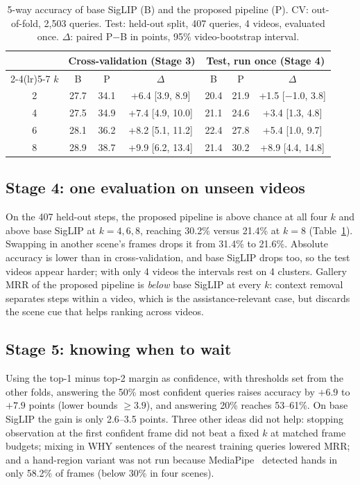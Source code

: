 \documentclass[conference,a4paper]{IEEEtran}
\begin{document}
\begin{table}[t]
\caption{5-way accuracy of base SigLIP (B) and the proposed pipeline (P). CV: out-of-fold, 2,503 queries. Test: held-out split, 407 queries, 4 videos, evaluated once. $\Delta$: paired P$-$B in points, 95\% video-bootstrap interval.}
\label{tab:ladder}
\centering
\setlength{\tabcolsep}{2.6pt}
\footnotesize
\begin{tabular}{ccccccc}
\toprule
& \multicolumn{3}{c}{Cross-validation (Stage 3)} & \multicolumn{3}{c}{Test, run once (Stage 4)} \\
\cmidrule(lr){2-4}\cmidrule(lr){5-7}
$k$ & B & P & $\Delta$ & B & P & $\Delta$ \\
\midrule
2 & 27.7 & 34.1 & +6.4 [3.9, 8.9] & 20.4 & 21.9 & +1.5 [$-$1.0, 3.8] \\
4 & 27.5 & 34.9 & +7.4 [4.9, 10.0] & 21.1 & 24.6 & +3.4 [1.3, 4.8] \\
6 & 28.1 & 36.2 & +8.2 [5.1, 11.2] & 22.4 & 27.8 & +5.4 [1.0, 9.7] \\
8 & 28.9 & 38.7 & +9.9 [6.2, 13.4] & 21.4 & 30.2 & +8.9 [4.4, 14.8] \\
\bottomrule
\end{tabular}
\end{table}

\subsection{Stage 4: one evaluation on unseen videos}
On the 407 held-out steps, the proposed pipeline is above chance at all four $k$ and above base SigLIP at $k=4,6,8$, reaching 30.2\% versus 21.4\% at $k=8$ (Table~\ref{tab:ladder}). Swapping in another scene's frames drops it from 31.4\% to 21.6\%. Absolute accuracy is lower than in cross-validation, and base SigLIP drops too, so the test videos appear harder; with only 4 videos the intervals rest on 4 clusters. Gallery MRR of the proposed pipeline is \emph{below} base SigLIP at every $k$: context removal separates steps within a video, which is the assistance-relevant case, but discards the scene cue that helps ranking across videos.

\subsection{Stage 5: knowing when to wait}
Using the top-1 minus top-2 margin as confidence, with thresholds set from the other folds, answering the 50\% most confident queries raises accuracy by $+6.9$ to $+7.9$ points (lower bounds $\geq 3.9$), and answering 20\% reaches 53--61\%. On base SigLIP the gain is only 2.6--3.5 points. Three other ideas did not help: stopping observation at the first confident frame did not beat a fixed $k$ at matched frame budgets; mixing in WHY sentences of the nearest training queries lowered MRR; and a hand-region variant was not run because MediaPipe~\cite{zhang2020mediapipe} detected hands in only 58.2\% of frames (below 30\% in four scenes).
\end{document}
